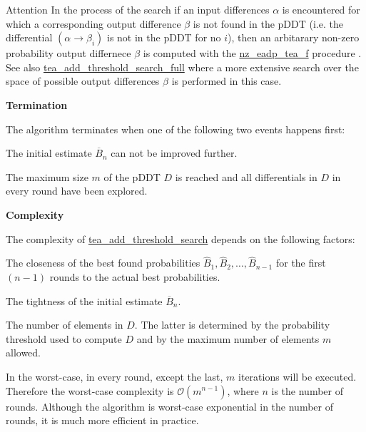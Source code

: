 \begin{DoxyAttention}{\-Attention}
\-In the process of the search if an input differences $\alpha$ is encountered for which a corresponding output difference $\beta$ is not found in the p\-D\-D\-T (i.\-e. the differential $(\alpha \rightarrow \beta_i)$ is not in the p\-D\-D\-T for no $i$), then an arbitarary non-\/zero probability output differnece $\beta$ is computed with the \hyperlink{eadp-tea-f_8hh_a288ad628f2a68f2f32c7c065a2c87e82}{nz\-\_\-eadp\-\_\-tea\-\_\-f} procedure . \-See also \hyperlink{tea-add-threshold-search_8cc_a760f25356b1203a35c8ece3f4e8a038c}{tea\-\_\-add\-\_\-threshold\-\_\-search\-\_\-full} where a more extensive search over the space of possible output differences $\beta$ is performed in this case.
\end{DoxyAttention}
{\bfseries \-Termination} 

\-The algorithm terminates when one of the following two events happens first\-:


\begin{DoxyEnumerate}
\item \-The initial estimate ${\overline B_n}$ can not be improved further.
\item \-The maximum size $m$ of the p\-D\-D\-T $D$ is reached and all differentials in $D$ in every round have been explored.
\end{DoxyEnumerate}

{\bfseries \-Complexity} 

\-The complexity of \hyperlink{tea-add-threshold-search_8cc_ab59db616cde68bf9245c7d24c98e3a6c}{tea\-\_\-add\-\_\-threshold\-\_\-search} depends on the following factors\-:


\begin{DoxyEnumerate}
\item \-The closeness of the best found probabilities ${{\widehat B_1}, {\widehat B_2}, \ldots, {\widehat B_{n-1}}}$ for the first $(n - 1)$ rounds to the actual best probabilities.
\item \-The tightness of the initial estimate ${\overline B_n}$.
\item \-The number of elements in $D$. \-The latter is determined by the probability threshold used to compute $D$ and by the maximum number of elements $m$ allowed.
\end{DoxyEnumerate}

\-In the worst-\/case, in every round, except the last, $m$ iterations will be executed. \-Therefore the worst-\/case complexity is $\mathcal{O}(m^{n-1})$, where $n$ is the number of rounds. \-Although the algorithm is worst-\/case exponential in the number of rounds, it is much more efficient in practice.

